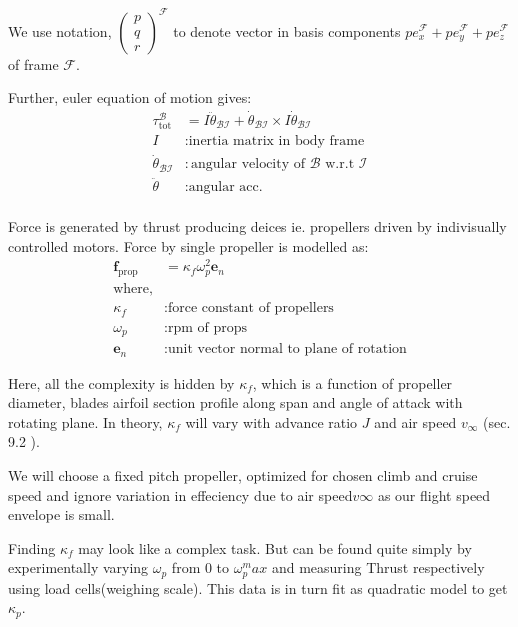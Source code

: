 We use notation, $\begin{pmatrix}p\\q\\r\end{pmatrix}^\mathcal{F}$ to denote vector in basis components $p e^\mathcal{F}_x + p e^\mathcal{F}_y + p e^\mathcal{F}_z$ of frame $\mathcal{F}$.

Further, euler equation of motion gives:
\begin{align*}
    \tau^{\mathcal{B}}_\text{tot} &= I\ddot{\theta}_\mathcal{BI} + \dot{\theta}_\mathcal{BI} \times I\dot{\theta}_\mathcal{BI}\\
    I &: \text{inertia matrix in body frame}\\
    \dot{\theta}_\mathcal{BI} &: \text{angular velocity of $\mathcal{B}$ w.r.t $\mathcal{I}$}\\
    \ddot{\theta} &: \text{angular acc.}\\
\end{align*}

Force is generated by thrust producing deices ie. propellers driven by indivisually controlled motors. Force by single propeller is modelled as:
\begin{align*}
    \mathbf{f}_\text{prop} &= \kappa_f \omega_p^2 \mathbf{e}_n\\
    \text{where,}\\
    \kappa_f&:\text{force constant of propellers}\\
    \omega_p&:\text{rpm of props}\\
    \mathbf{e}_n&:\text{unit vector normal to plane of rotation}
\end{align*}

Here, all the complexity is hidden by $\kappa_f$, which is a function of propeller diameter, blades airfoil section profile along span and angle of attack with rotating plane. In theory, $\kappa_f$ will vary with advance ratio $J$ and air speed $v_\infty$ (sec. 9.2 \cite{anderson2005introduction}).

We will choose a fixed pitch propeller, optimized for chosen climb and cruise speed and ignore variation in effeciency due to air speed$v\infty$ as our flight speed envelope is small.

Finding $\kappa_f$ may look like a complex task. But can be found quite simply by experimentally varying $\omega_p$ from 0 to $\omega_p^max$ and measuring Thrust respectively using load cells(weighing scale). This data is in turn fit as quadratic model to get $\kappa_p$.

